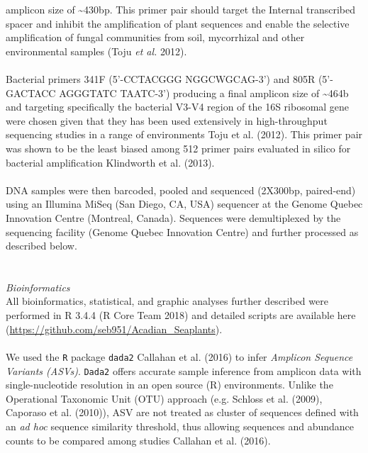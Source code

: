\documentclass[11pt,]{article}
\begin{document}
amplicon size of \textasciitilde{}430bp. This primer pair should target
the Internal transcribed spacer and inhibit the amplification of plant
sequences and enable the selective amplification of fungal communities
from soil, mycorrhizal and other environmental samples (Toju \emph{et
al.} 2012).\\
\hspace*{0.333em}\\
Bacterial primers 341F (5'-CCTACGGG NGGCWGCAG-3') and 805R (5'-GACTACC
AGGGTATC TAATC-3') producing a final amplicon size of
\textasciitilde{}464b and targeting specifically the bacterial V3-V4
region of the 16S ribosomal gene were chosen given that they has been
used extensively in high-throughput sequencing studies in a range of
environments Toju et al. (2012). This primer pair was shown to be the
least biased among 512 primer pairs evaluated in silico for bacterial
amplification Klindworth et al. (2013).\\
\hspace*{0.333em}\\
DNA samples were then barcoded, pooled and sequenced (2X300bp,
paired-end) using an Illumina MiSeq (San Diego, CA, USA) sequencer at
the Genome Quebec Innovation Centre (Montreal, Canada). Sequences were
demultiplexed by the sequencing facility (Genome Quebec Innovation
Centre) and further processed as described below.\\
\hspace*{0.333em}\\
\hspace*{0.333em}\\
\emph{Bioinformatics}\\
All bioinformatics, statistical, and graphic analyses further described
were performed in R 3.4.4 (R Core Team 2018) and detailed scripts are
available here (\url{https://github.com/seb951/Acadian_Seaplants}).\\
\hspace*{0.333em}\\
We used the \texttt{R} package \texttt{dada2} Callahan et al. (2016) to
infer \emph{Amplicon Sequence Variants (ASVs)}. \texttt{Dada2} offers
accurate sample inference from amplicon data with single-nucleotide
resolution in an open source (R) environments. Unlike the Operational
Taxonomic Unit (OTU) approach (e.g. Schloss et al. (2009), Caporaso et
al. (2010)), ASV are not treated as cluster of sequences defined with an
\emph{ad hoc} sequence similarity threshold, thus allowing sequences and
abundance counts to be compared among studies Callahan et al. (2016).\\
\end{document}
